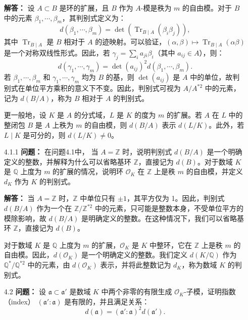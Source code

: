 \documentclass[UTF8]{ctexart}
\begin{document}
\begin{enumerate}
\textbf{解答：} 设 \( A \subset B \) 是环的扩展，且 \( B \) 作为 \( A \)-模是秩为 \( m \) 的自由模。对于 \( B \) 中的元素 \(\beta_1, \cdots, \beta_m\)，其判别式定义为：
\[
d(\beta_1, \cdots, \beta_m) = \det\left(\operatorname{Tr}_{B \mid A}(\beta_i \beta_j)\right),
\]
其中 \(\operatorname{Tr}_{B \mid A}\) 是 \( B \) 相对于 \( A \) 的迹映射。可以验证，\((\alpha, \beta) \mapsto \operatorname{Tr}_{B \mid A}(\alpha \beta)\) 是一个对称双线性形式。因此，若 \(\gamma_j = \sum_i a_{ji} \beta_i\)（其中 \( a_{ij} \in A \)），则：
\[
d(\gamma_1, \cdots, \gamma_m) = \det(a_{ij})^2 d(\beta_1, \cdots, \beta_m).
\]
若 \(\beta_1, \cdots, \beta_m\) 和 \(\gamma_1, \cdots, \gamma_m\) 均为 \( B \) 的基，则 \(\det(a_{ij})\) 是 \( A \) 中的单位，故判别式在单位平方乘积的意义下不变。因此，判别式可视为 \( A / A^{*2} \) 中的元素，记为 \( d(B / A) \)，称为 \( B \) 相对于 \( A \) 的判别式。

更一般地，设 \( K \) 是 \( A \) 的分式域，\( L \) 是 \( K \) 的度为 \( m \) 的扩展。若 \( A \) 在 \( L \) 中的整闭包 \( B \) 是 \( A \) 上秩为 \( m \) 的自由模，则 \( d(B / A) \) 表示 \( d(L / K) \)。此外，若 \( L \mid K \) 是可分的，则 \( d(L / K) \neq 0 \)。

\item[4.1.1] \textbf{问题：} 在问题4.1中， 当 \( A = \mathbb{Z} \) 时，说明判别式 \( d(B / A) \) 是一个明确定义的整数，并解释为什么可以省略基环 \(\mathbb{Z}\)，直接记为 \( d(B) \)。对于数域 \( K \) 是 \(\mathbb{Q}\) 上度为 \( m \) 的扩展的情况，说明环 \(\mathcal{O}_K\) 在 \(\mathbb{Z}\) 上是秩 \( m \) 的自由模，并定义 \( d_K \) 作为 \( K \) 的判别式。

\textbf{解答：} 当 \( A = \mathbb{Z} \) 时，\(\mathbb{Z}\) 中单位只有 \( \pm 1 \)，其平方仅为 1。因此，判别式 \( d(B / A) \) 作为一个在 \(\mathbb{Z} / \mathbb{Z}^{*2} \) 中的元素，只可能是整数本身，不受单位平方的模除影响，故 \( d(B / A) \) 是明确定义的整数。在这种情况下，我们可以省略基环 \(\mathbb{Z}\)，直接记为 \( d(B) \)。

对于数域 \( K \) 是 \(\mathbb{Q}\) 上度为 \( m \) 的扩展，\(\mathcal{O}_K\) 是 \( K \) 中整环，它在 \(\mathbb{Z}\) 上是秩 \( m \) 的自由模。因此，\( d(\mathcal{O}_K) \) 是一个明确定义的整数。我们定义 \( d(K / \mathbb{Q}) \) 作为 \(\mathbb{Q}^*/\mathbb{Q}^{*2}\) 中的元素，由 \( d(\mathcal{O}_K) \) 表示，并将此整数记为 \( d_K \)，称为数域 \( K \) 的判别式。

\item[4.2] \textbf{问题：} 设 \(\mathfrak{a} \subset \mathfrak{a}' \) 是数域 \( K \) 中两个非零的有限生成 \(\mathcal{O}_K\)-子模，证明指数（index） \( (\mathfrak{a}' : \mathfrak{a}) \) 是有限的，并且满足关系：
\[
d(\mathfrak{a}) = (\mathfrak{a}' : \mathfrak{a})^2 d(\mathfrak{a}').
\]


\end{enumerate}
\end{document}

